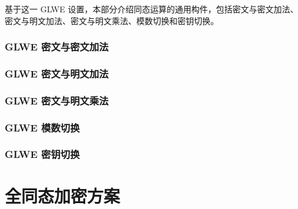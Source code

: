 \documentclass[11pt]{article}
\begin{document}
基于这一 GLWE 设置，本部分介绍同态运算的通用构件，包括密文与密文加法、密文与明文加法、密文与明文乘法、模数切换和密钥切换。


\clearpage


\section{GLWE 密文与密文加法}
\label{sec:glwe-add-cipher}


\clearpage

\section{GLWE 密文与明文加法}
\label{sec:glwe-add-plain}


\clearpage

\section{GLWE 密文与明文乘法}
\label{sec:glwe-mult-plain}


\clearpage

\section{GLWE 模数切换}
\label{sec:modulus-switching}


\clearpage


\section{GLWE 密钥切换}
\label{sec:glwe-key-switching}




\clearpage


%


\part{全同态加密方案}
\label{part:fhe-schemes}

\renewcommand{\thesection}{D-\arabic{section}}
\setcounter{section}{0}
\end{document}
